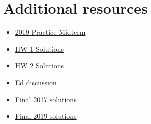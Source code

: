 \documentclass{article}
\begin{document}
\section{Additional resources}
\begin{itemize}
  \item \href{https://web.stanford.edu/class/ee364a/solutions/midterm_19_sol.pdf}{2019 Practice Midterm}
  \item \href{https://web.stanford.edu/class/ee364a/solutions/hw/2022_hw1sol.pdf}{HW 1 Solutions}
  \item \href{https://web.stanford.edu/class/ee364a/solutions/hw/2022_hw2sol.pdf}{HW 2 Solutions}
  \item \href{https://edstem.org/us/courses/16230/discussion/}{Ed discussion}
  \item \href{https://web.stanford.edu/class/ee364a/solutions/final_17_sol.pdf}{Final 2017 solutions}
  \item \href{https://web.stanford.edu/class/ee364a/solutions/final_19_sol.pdf}{Final 2019 solutions}
\end{itemize}
\end{document}
